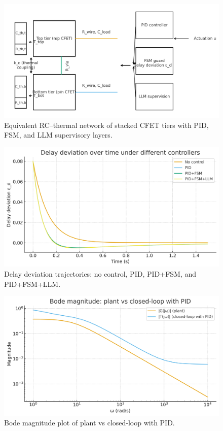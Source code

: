 \documentclass[conference]{IEEEtran}
\begin{document}
\begin{figure}[h]
\centering
\includegraphics[width=0.9\columnwidth]{figs/fig1_cfet_rc_thermal_equiv.png}
\caption{Equivalent RC--thermal network of stacked CFET tiers with PID, FSM, and LLM supervisory layers.}
\label{fig:equiv}
\end{figure}

\begin{figure}[h]
\centering
\includegraphics[width=0.9\columnwidth]{figs/fig2_time_response.png}
\caption{Delay deviation trajectories: no control, PID, PID+FSM, and PID+FSM+LLM.}
\label{fig:delay}
\end{figure}

\begin{figure}[h]
\centering
\includegraphics[width=0.9\columnwidth]{figs/fig3_bode_magnitude.png}
\caption{Bode magnitude plot of plant vs closed-loop with PID.}
\label{fig:bode}
\end{figure}
\end{document}
